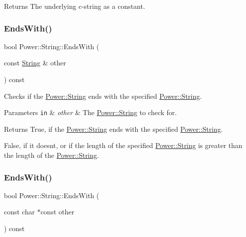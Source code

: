\begin{DoxyReturn}{Returns}
The underlying c-\/string as a constant. 
\end{DoxyReturn}
\mbox{\label{class_power_1_1_string_ae936d98f4be00ce5b901a561cac63ab0}} 
\subsubsection{\texorpdfstring{Ends\+With()}{EndsWith()}\hspace{0.1cm}{\footnotesize\ttfamily [1/4]}}
{\footnotesize\ttfamily bool Power\+::\+String\+::\+Ends\+With (\begin{DoxyParamCaption}\item[{const \hyperlink{class_power_1_1_string}{String} \&}]{other }\end{DoxyParamCaption}) const\hspace{0.3cm}{\ttfamily [inline]}}



Checks if the \hyperlink{class_power_1_1_string}{Power\+::\+String} ends with the specified \hyperlink{class_power_1_1_string}{Power\+::\+String}. 


\begin{DoxyParams}[1]{Parameters}
\mbox{\tt in}  & {\em other} & The \hyperlink{class_power_1_1_string}{Power\+::\+String} to check for. \\
\hline
\end{DoxyParams}
\begin{DoxyReturn}{Returns}
True, if the \hyperlink{class_power_1_1_string}{Power\+::\+String} ends with the specified \hyperlink{class_power_1_1_string}{Power\+::\+String}. 

False, if it doesn\textquotesingle{}t, or if the length of the specified \hyperlink{class_power_1_1_string}{Power\+::\+String} is greater than the length of the \hyperlink{class_power_1_1_string}{Power\+::\+String}. 
\end{DoxyReturn}
\mbox{\label{class_power_1_1_string_a007514d96b8e99416e0c10f6b72675c5}} 
\subsubsection{\texorpdfstring{Ends\+With()}{EndsWith()}\hspace{0.1cm}{\footnotesize\ttfamily [2/4]}}
{\footnotesize\ttfamily bool Power\+::\+String\+::\+Ends\+With (\begin{DoxyParamCaption}\item[{const char $\ast$const}]{other }\end{DoxyParamCaption}) const\hspace{0.3cm}{\ttfamily [inline]}}




